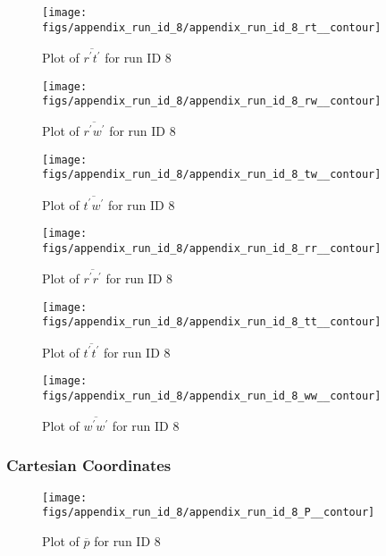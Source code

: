 \begin{figure}[H]
\centering
\texttt{[image: figs/appendix\_run\_id\_8/appendix\_run\_id\_8\_rt\_\_contour]}
\caption{Plot of $\overline{r^\prime t^\prime}$ for run ID 8}
\label{fig:appendix_run_id_8_rt__contour}
\end{figure}


\begin{figure}[H]
\centering
\texttt{[image: figs/appendix\_run\_id\_8/appendix\_run\_id\_8\_rw\_\_contour]}
\caption{Plot of $\overline{r^\prime w^\prime}$ for run ID 8}
\label{fig:appendix_run_id_8_rw__contour}
\end{figure}


\begin{figure}[H]
\centering
\texttt{[image: figs/appendix\_run\_id\_8/appendix\_run\_id\_8\_tw\_\_contour]}
\caption{Plot of $\overline{t^\prime w^\prime}$ for run ID 8}
\label{fig:appendix_run_id_8_tw__contour}
\end{figure}


\begin{figure}[H]
\centering
\texttt{[image: figs/appendix\_run\_id\_8/appendix\_run\_id\_8\_rr\_\_contour]}
\caption{Plot of $\overline{r^\prime r^\prime}$ for run ID 8}
\label{fig:appendix_run_id_8_rr__contour}
\end{figure}


\begin{figure}[H]
\centering
\texttt{[image: figs/appendix\_run\_id\_8/appendix\_run\_id\_8\_tt\_\_contour]}
\caption{Plot of $\overline{t^\prime t^\prime}$ for run ID 8}
\label{fig:appendix_run_id_8_tt__contour}
\end{figure}


\begin{figure}[H]
\centering
\texttt{[image: figs/appendix\_run\_id\_8/appendix\_run\_id\_8\_ww\_\_contour]}
\caption{Plot of $\overline{w^\prime w^\prime}$ for run ID 8}
\label{fig:appendix_run_id_8_ww__contour}
\end{figure}


\subsubsection{Cartesian Coordinates}
\begin{figure}[H]
\centering
\texttt{[image: figs/appendix\_run\_id\_8/appendix\_run\_id\_8\_P\_\_contour]}
\caption{Plot of $\overline{p}$ for run ID 8}
\label{fig:appendix_run_id_8_P__contour}
\end{figure}


